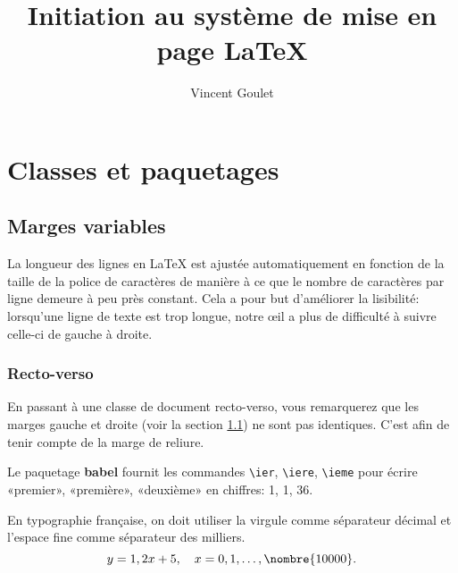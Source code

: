 \documentclass[11pt]{memoir}
\title{Initiation au système de mise en page \LaTeX}
\author{Vincent Goulet}
\begin{document}
\maketitle

\chapter{Classes et paquetages}
\label{chap:classes}

\section{Marges variables}
\label{sec:marges}

La longueur des lignes en {\LaTeX} est ajustée automatiquement en
fonction de la taille de la police de caractères de manière à ce que le
nombre de caractères par ligne demeure à peu près constant. Cela a
pour but d'améliorer la lisibilité: lorsqu'une ligne de texte est trop
longue, notre œil a plus de difficulté à suivre celle-ci de gauche à
droite.

\subsection{Recto-verso}
\label{sec:marges:recto-verso}

En passant à une classe de document recto-verso, vous remarquerez que
les marges gauche et droite (voir la section \ref{sec:marges}) ne sont
pas identiques. C'est afin de tenir compte de la marge de reliure.

Le paquetage \textbf{babel} fournit les commandes \verb=\ier=,
\verb=\iere=, \verb=\ieme= pour écrire «premier», «première»,
«deuxième» en chiffres: 1{\ier}, 1{\iere}, 36{\ieme}.

En typographie française, on doit utiliser la virgule comme séparateur
décimal et l'espace fine comme séparateur des milliers.
\begin{displaymath}
  y = 1,2x + 5, \quad x = 0, 1, \dots, \nombre{10 000}.
\end{displaymath}
\end{document}
